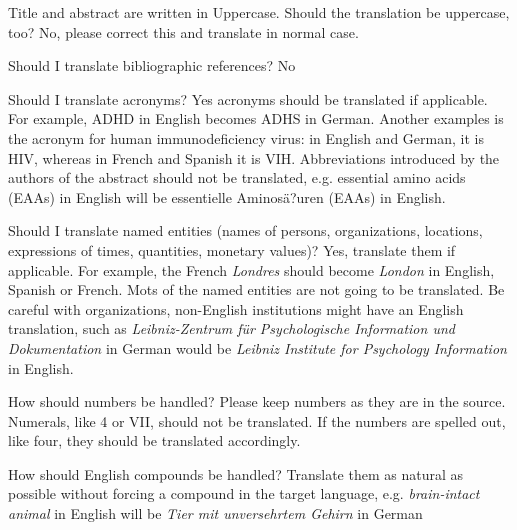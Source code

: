 \documentclass[a4paper,10pt]{article}
\newenvironment{faq}{\begin{description}[style=nextline]}{\end{description}}
\newcommand{\cris}[1]{{\color{red}{#1}}}
\begin{document}
\begin{faq}

\item[Title and abstract are written in Uppercase. Should the translation be uppercase, too?]
No, please correct this and translate in normal case. \cris{we might not need this if we correct this beforehand.}
    
  \item[Should I translate bibliographic references?]
    No
 
  \item[Should I translate acronyms?]
    Yes acronyms should be translated if applicable. For example, ADHD in English becomes ADHS in German. Another examples is the acronym for human immunodeficiency virus: in English and German, it is HIV, whereas in French and Spanish it is VIH. \cris{right?}
    Abbreviations introduced by the authors of the abstract should not be translated, e.g. essential amino acids (EAAs) in English will be essentielle Aminos\"a?uren (EAAs) in English. 

  \item[Should I translate named entities (names of persons, organizations, locations, expressions of times, quantities, monetary values)?]
    Yes, translate them if applicable. For example, the French \textit{Londres} should become \textit{London} in English, Spanish or French. Mots of the named entities are not going to be translated. Be careful with organizations, non-English institutions might have an English translation, such as \textit{Leibniz-Zentrum f\"ur Psychologische Information und Dokumentation} in German would be \textit{Leibniz Institute for Psychology Information} in English. \cris{not sure which language to choose for a French or Spanish text}
  
\item[How should numbers be handled?]
 Please keep numbers as they are in the source. Numerals, like 4 or VII, should not be translated. If the numbers are spelled out, like four, they should be translated accordingly.
    
\item[How should English compounds be handled?]
Translate them as natural as possible without forcing a compound in the target language, e.g. \textit{brain-intact animal} in English will be \textit{Tier mit unversehrtem Gehirn} in German
\end{faq}
\end{document}
